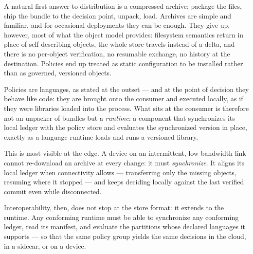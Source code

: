 \documentclass[11pt,a4paper]{article}
\newcommand{\term}[1]{\emph{#1}}                 %
\begin{document}
A natural first answer to distribution is a compressed archive: package
the files, ship the bundle to the decision point, unpack, load. Archives
are simple and familiar, and for occasional deployments they can be
enough. They give up, however, most of what the object model provides:
filesystem semantics return in place of self-describing objects, the
whole store travels instead of a delta, and there is no per-object
verification, no resumable exchange, no history at the destination.
Policies end up treated as static configuration to be installed rather
than as governed, versioned objects.

Policies are languages, as stated at the outset --- and at the point of
decision they behave like code: they are brought onto the consumer and
executed locally, as if they were libraries loaded into the process. What
sits at the consumer is therefore not an unpacker of bundles but a
\term{runtime}: a component that synchronizes its local ledger with the
policy store and evaluates the synchronized version in place, exactly as
a language runtime loads and runs a versioned library.

This is most visible at the edge. A device on an intermittent,
low-bandwidth link cannot re-download an archive at every change: it must
\term{synchronize}. It aligns its local ledger when connectivity allows
--- transferring only the missing objects, resuming where it stopped ---
and keeps deciding locally against the last verified commit even while
disconnected.

Interoperability, then, does not stop at the store format: it extends to
the runtime. Any conforming runtime must be able to synchronize any
conforming ledger, read its manifest, and evaluate the partitions whose
declared languages it supports --- so that the same policy group yields
the same decisions in the cloud, in a sidecar, or on a device.
\end{document}
